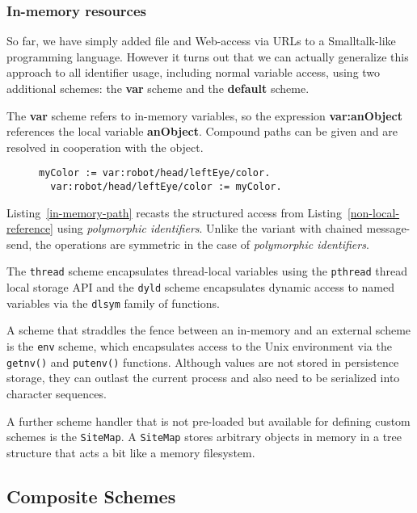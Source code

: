 \documentclass[preprint,authoryear]{acm_proc_article-sp}
\begin{document}
\subsubsection{In-memory resources}
\label{inmemory}

So far, we have simply added file and Web-access via URLs to a 
Smalltalk-like programming language.  However it turns out that we can actually generalize
this approach to all identifier usage, including normal variable access, using
two additional schemes:  the {\bf var} scheme and the {\bf default} scheme.

The {\bf var} scheme refers to in-memory variables, so the expression
 {\bf var:anObject} references the
local variable {\bf anObject}.   Compound paths can be given and are resolved in
cooperation with the object.


\begin{figure}[htbp]
\begin{lstlisting}[style=L,label=in-memory-path,caption=In-memory access path.]
  myColor := var:robot/head/leftEye/color.
  var:robot/head/leftEye/color := myColor.
\end{lstlisting}
\end{figure}

Listing~\ref{in-memory-path} recasts the structured access from 
Listing~\ref{non-local-reference} using \emph{polymorphic identifiers}.  Unlike the variant
with chained message-send, the operations are symmetric in the case of \emph{polymorphic identifiers}.

The {\tt thread} scheme encapsulates thread-local variables using the {\tt pthread} thread
local storage API and the {\tt dyld} scheme encapsulates dynamic access to
named variables via the {\tt dlsym} family of functions.

A scheme that straddles the fence between an in-memory and an external 
scheme is the {\tt env} scheme, which encapsulates access to the Unix
environment via the {\tt getnv()} and {\tt putenv()} functions.  Although 
values are not stored in persistence storage, they can outlast the
current process and also need to be serialized into character sequences.

A further scheme handler that is not pre-loaded but available for defining
custom schemes is the {\tt SiteMap}.  A {\tt SiteMap} stores arbitrary objects
in memory in a tree structure that acts a bit like a memory filesystem.

\subsection{Composite Schemes}
\end{document}
